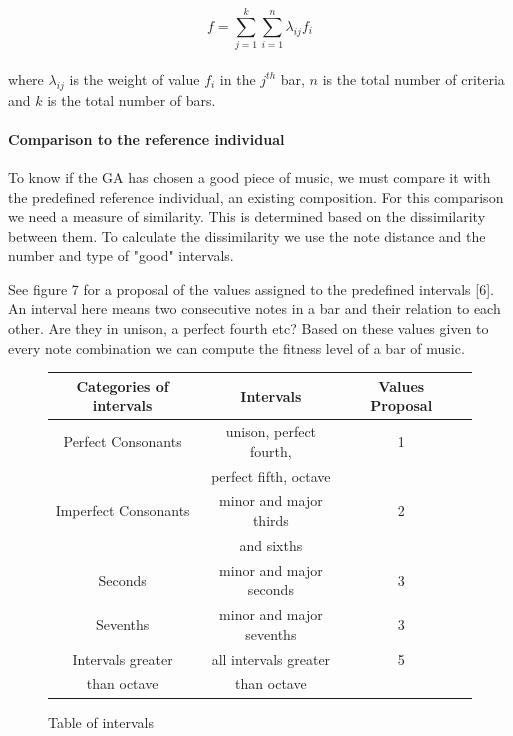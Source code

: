 \documentclass[12pt]{article}
\begin{document}
\begin{equation}
f = \sum_{j = 1}^{k} \sum_{i = 1}^{n}\lambda_{ij} f_i
\end{equation}
\\
where $\lambda_{ij}$ is the weight of value $f_i$ in the $j^{th}$ bar, $n$ is the total number of criteria and $k$ is the total number of bars.

\paragraph{Comparison to the reference individual}

To know if the GA has chosen a good piece of music, we must compare it with the predefined reference individual, an existing composition. For this comparison we need a measure of similarity. This is determined based on the dissimilarity between them. To calculate the dissimilarity we use the note distance and the number and type of "good" intervals.
\newline
\newline

See figure 7 for a proposal of the values assigned to the predefined intervals [6]. An interval here means two consecutive notes in a bar and their relation to each other. Are they in unison, a perfect fourth etc? Based on these values given to every note combination we can compute the fitness level of a bar of music.

\begin{figure}
\begin{tabular}{| c | c | c | c |}
\hline
\textbf{Categories of intervals} & \textbf{Intervals} & \textbf{Values Proposal} \\
\hline
Perfect Consonants & unison, perfect fourth, & 1  \\ 
& perfect fifth, octave & \\
\hline
Imperfect Consonants & minor and major thirds & 2 \\
& and sixths & \\
\hline
Seconds & minor and major seconds & 3 \\
 \hline
Sevenths & minor and major sevenths & 3 \\
\hline
Intervals greater & all intervals greater & 5 \\
than octave & than octave & \\

\hline
\end{tabular}
\caption{Table of intervals}
\end{figure}
\end{document}
